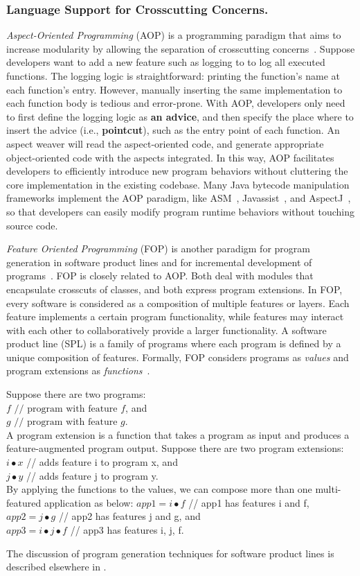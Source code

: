 \subsubsection{Language Support for Crosscutting Concerns.}
{\it Aspect-Oriented Programming} (AOP) is a programming paradigm that aims to increase modularity by allowing the separation of crosscutting concerns~\cite{aspectj}. Suppose developers want to add a new feature such as logging to to log all executed functions. The logging logic is straightforward: printing the function's name at each function's entry. However, manually inserting the same implementation to each function body is tedious and error-prone. With AOP, developers only need to first define the logging logic as \textbf{an advice}, and then specify the place where to insert the advice (i.e., \textbf{pointcut}), such as the entry point of each function. An aspect weaver will read the aspect-oriented code, and generate appropriate object-oriented code with the aspects integrated. In this way, AOP facilitates developers to efficiently introduce new program behaviors without cluttering the core implementation in the existing codebase. Many Java bytecode manipulation frameworks implement the AOP paradigm, like ASM~\cite{asm}, Javassist~\cite{javassist}, and AspectJ~\cite{aspectj}, so that developers can easily modify program runtime behaviors without touching source code. 

{\it Feature Oriented Programming} (FOP) is another paradigm for program generation in software product lines and for incremental development of programs~\cite{Batory1992:DIH}. FOP is closely related to AOP. Both deal with modules that encapsulate crosscuts of classes, and both express program extensions. In FOP, every software is considered as a composition of multiple features or layers. Each feature implements a certain program functionality, while features may interact with each other to collaboratively provide a larger functionality. A software product line (SPL) is a family of programs where each program is defined by a unique composition of features. Formally, FOP considers programs as \emph{values} and program extensions as \emph{functions}~\cite{Lammel2013:fop}. 

\noindent Suppose there are two programs: \\
$f\text{	// program with feature }f$, and\\
$g\text{	// program with feature }g$.\\
A program extension is a function that takes a program as input and produces a feature-augmented program output. Suppose there are two program extensions:\\
$i \bullet x$ // adds feature i to program x, and \\
$j \bullet y$ // adds feature j to program y.\\
By applying the functions to the values, we can compose more than one multi-featured application as below:
$app1 = i \bullet f$ // app1 has features i and f,\\
$app2 = j \bullet g$ // app2 has features j and g, and\\ 
$app3 = i \bullet j \bullet f$ // app3 has features i, j, f.
 
The discussion of program generation techniques for software product lines is described elsewhere in . 

